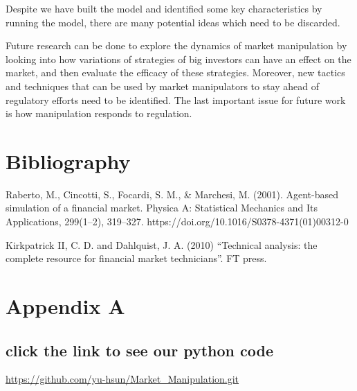 \documentclass[a4paper, 12pt]{article}
\begin{document}
Despite we have built the model and identified some key characteristics by running the model, there are many potential ideas which need to be discarded. 

Future research can be done to explore the dynamics of market manipulation by looking into how variations of strategies of big investors can have an effect on the market, and then evaluate the efficacy of these strategies. Moreover, new tactics and techniques that can be used by market manipulators to stay ahead of regulatory efforts need to be identified. The last important issue for future work is how manipulation responds to regulation.

\section{Bibliography}
    \begin{thebibliography}{1}
    Raberto, M., Cincotti, S., Focardi, S. M., \& Marchesi, M. (2001). Agent-based simulation of a financial market. Physica A: Statistical Mechanics and Its Applications, 299(1–2), 319–327. https://doi.org/10.1016/S0378-4371(01)00312-0


    Kirkpatrick II, C. D. and Dahlquist, J. A. (2010) “Technical analysis: the complete resource for financial market technicians”. FT press.
    
    \end{thebibliography}
\clearpage
\section*{Appendix A}
\subsection*{click the link to see our python code}
\href{github}{https://github.com/yu-hsun/Market\_Manipulation.git}


\clearpage
\end{document}

